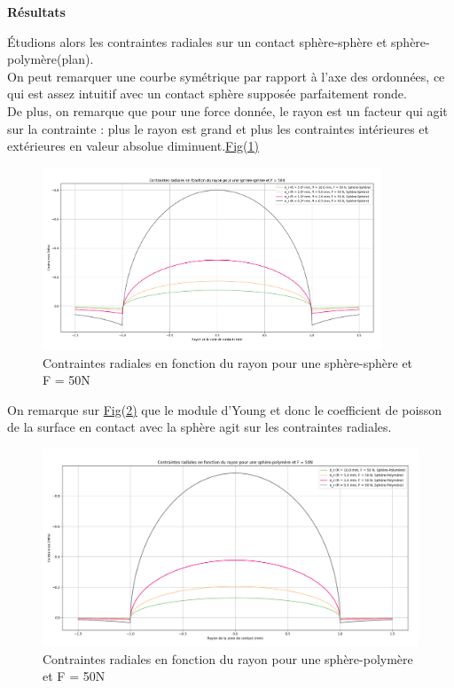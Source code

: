 \documentclass[a4paper,12pt]{article}
\begin{document}
\begin{center}
	\textbf{Résultats}
\end{center}
Étudions alors les contraintes radiales sur un contact sphère-sphère et sphère-polymère(plan).
\bigskip
\\
On peut remarquer une courbe symétrique par rapport à l'axe des ordonnées, ce qui est assez intuitif avec un contact sphère supposée parfaitement ronde.\\
De plus, on remarque que pour une force donnée, le rayon est un facteur qui agit sur la contrainte : plus le rayon est grand et plus les contraintes intérieures et extérieures en valeur absolue diminuent.\hyperref[fig:mon_image1]{Fig(1)}
\begin{figure}[H] %
	\centering
	\includegraphics[width=0.9\textwidth]{rad1.png} %
	\caption{Contraintes radiales en fonction du rayon pour une sphère-sphère et F = 50N} %
	\label{fig:mon_image1} %
\end{figure}
On remarque sur \hyperref[fig:mon_image2]{Fig(2)} que le module d'Young et donc le coefficient de poisson de la surface en contact avec la sphère agit sur les contraintes radiales.
\begin{figure}[H] %
	\centering
	\includegraphics[width=1\textwidth]{rad2.png} %
	\caption{Contraintes radiales en fonction du rayon pour une sphère-polymère et F = 50N} %
	\label{fig:mon_image2} %
\end{figure}
\end{document}
